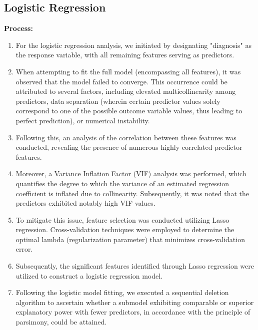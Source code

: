 \documentclass[conference]{IEEEtran}
\begin{document}
\subsection{Logistic Regression}
\vspace{0.2cm}
\textbf{Process:}
\vspace{0.2cm}
\begin{enumerate}
    \item For the logistic regression analysis, we initiated by designating "diagnosis" as the response variable, with all remaining features serving as predictors.
    
    \item When attempting to fit the full model (encompassing all features), it was observed that the model failed to converge. This occurrence could be attributed to several factors, including elevated multicollinearity among predictors, data separation (wherein certain predictor values solely correspond to one of the possible outcome variable values, thus leading to perfect prediction), or numerical instability.
    
    \item Following this, an analysis of the correlation between these features was conducted, revealing the presence of numerous highly correlated predictor features.

    \item Moreover, a Variance Inflation Factor (VIF) analysis was performed, which quantifies the degree to which the variance of an estimated regression coefficient is inflated due to collinearity. Subsequently, it was noted that the predictors exhibited notably high VIF values.

    \item To mitigate this issue, feature selection was conducted utilizing Lasso regression. Cross-validation techniques were employed to determine the optimal lambda (regularization parameter) that minimizes cross-validation error.

    \item Subsequently, the significant features identified through Lasso regression were utilized to construct a logistic regression model.
    
    \item Following the logistic model fitting, we executed a sequential deletion algorithm to ascertain whether a submodel exhibiting comparable or superior explanatory power with fewer predictors, in accordance with the principle of parsimony, could be attained.


\end{enumerate}
\end{document}

